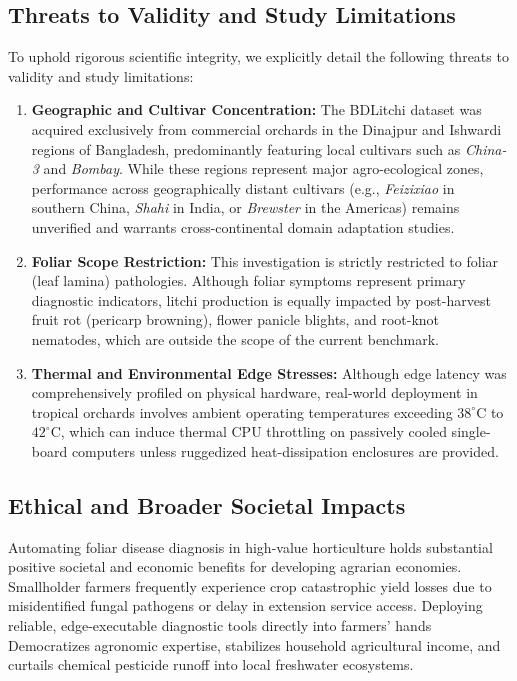 \subsection{Threats to Validity and Study Limitations}
To uphold rigorous scientific integrity, we explicitly detail the following threats to validity and study limitations:
\begin{enumerate}
    \item \textbf{Geographic and Cultivar Concentration:} The BDLitchi dataset was acquired exclusively from commercial orchards in the Dinajpur and Ishwardi regions of Bangladesh, predominantly featuring local cultivars such as \textit{China-3} and \textit{Bombay}. While these regions represent major agro-ecological zones, performance across geographically distant cultivars (e.g., \textit{Feizixiao} in southern China, \textit{Shahi} in India, or \textit{Brewster} in the Americas) remains unverified and warrants cross-continental domain adaptation studies.
    \item \textbf{Foliar Scope Restriction:} This investigation is strictly restricted to foliar (leaf lamina) pathologies. Although foliar symptoms represent primary diagnostic indicators, litchi production is equally impacted by post-harvest fruit rot (pericarp browning), flower panicle blights, and root-knot nematodes, which are outside the scope of the current benchmark.
    \item \textbf{Thermal and Environmental Edge Stresses:} Although edge latency was comprehensively profiled on physical hardware, real-world deployment in tropical orchards involves ambient operating temperatures exceeding $38^\circ\text{C}$ to $42^\circ\text{C}$, which can induce thermal CPU throttling on passively cooled single-board computers unless ruggedized heat-dissipation enclosures are provided.
\end{enumerate}

\subsection{Ethical and Broader Societal Impacts}
Automating foliar disease diagnosis in high-value horticulture holds substantial positive societal and economic benefits for developing agrarian economies. Smallholder farmers frequently experience crop catastrophic yield losses due to misidentified fungal pathogens or delay in extension service access. Deploying reliable, edge-executable diagnostic tools directly into farmers' hands Democratizes agronomic expertise, stabilizes household agricultural income, and curtails chemical pesticide runoff into local freshwater ecosystems.
